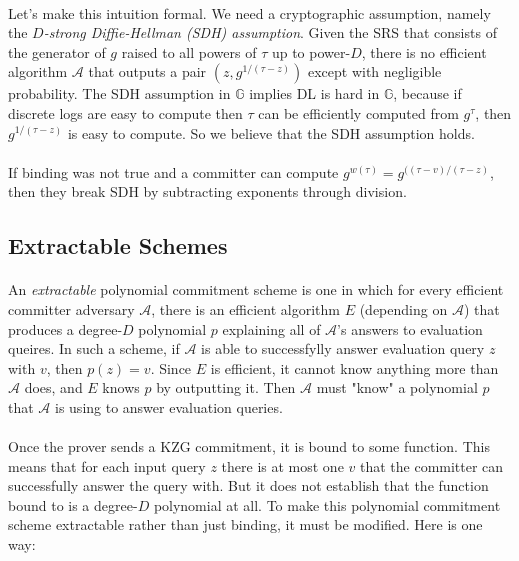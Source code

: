 \documentclass[11pt]{article}
\newcommand{\group}{\mathbb{G}}
\begin{document}
\paragraph{} Let's make this intuition formal. We need a cryptographic assumption, namely the \textit{$D$-strong Diffie-Hellman (SDH) assumption}. Given the SRS that consists of the generator of $g$ raised to all powers of $\tau$ up to power-$D$, there is no efficient algorithm $\mathcal{A}$ that outputs a pair $(z, g^{1/(\tau - z)})$ except with negligible probability. The SDH assumption in $\group$ implies DL is hard in $\group$, because if discrete logs are easy to compute then $\tau$ can be efficiently computed from $g^\tau$, then $g^{1/(\tau - z)}$ is easy to compute. So we believe that the SDH assumption holds.

\paragraph{} If binding was not true and a committer can compute $g^{w(\tau)} = g^{((\tau - v) / (\tau - z)}$, then they break SDH by subtracting exponents through division.

\subsection{Extractable Schemes}
\paragraph{} An \textit{extractable} polynomial commitment scheme is one in which for every efficient committer adversary $\mathcal{A}$, there is an efficient algorithm $E$ (depending on $\mathcal{A}$) that produces a degree-$D$ polynomial $p$ explaining all of $\mathcal{A}$'s answers to evaluation queires. In such a scheme, if $\mathcal{A}$ is able to successfylly answer evaluation query $z$ with $v$, then $p(z) = v$. Since $E$ is efficient, it cannot know anything more than $\mathcal{A}$ does, and $E$ knows $p$ by outputting it. Then $\mathcal{A}$ must "know" a polynomial $p$ that $\mathcal{A}$ is using to answer evaluation queries.

\paragraph{} Once the prover sends a KZG commitment, it is bound to some function. This means that for each input query $z$ there is at most one $v$ that the committer can successfully answer the query with. But it does not establish that the function bound to is a degree-$D$ polynomial at all. To make this polynomial commitment scheme extractable rather than just binding, it must be modified. Here is one way:
\end{document}
